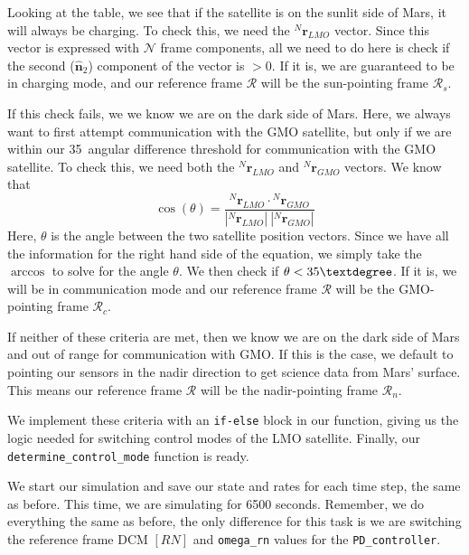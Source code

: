 \documentclass[conf]{new-aiaa}
\begin{document}
Looking at the table, we see that if the satellite is on the sunlit side of Mars, it will always be charging. To check this, we need the ${}^N\bm r_{LMO}$ vector. Since this vector is expressed with $\mathcal{N}$ frame components, all we need to do here is check if the second ($\hat{\bm n}_2$) component of the vector is $>0$. If it is, we are guaranteed to be in charging mode, and our reference frame $\mathcal{R}$ will be the sun-pointing frame $\mathcal{R}_s$. 

If this check fails, we we know we are on the dark side of Mars. Here, we always want to first attempt communication with the GMO satellite, but only if we are within our 35\textdegree\ angular difference threshold for communication with the GMO satellite. To check this, we need both the ${}^N\bm r_{LMO}$ and ${}^N\bm r_{GMO}$ vectors. We know that
\[
\cos(\theta) = \frac{{}^N\bm r_{LMO}\cdot{}^N\bm r_{GMO}}{|{}^N\bm r_{LMO}|\ |{}^N\bm r_{GMO}|}
\]
Here, $\theta$ is the angle between the two satellite position vectors. Since we have all the information for the right hand side of the equation, we simply take the $\arccos$ to solve for the angle $\theta$. We then check if $\theta < 35\textdegree$. If it is, we will be in communication mode and our reference frame $\mathcal{R}$ will be the GMO-pointing frame $\mathcal{R}_c$.

If neither of these criteria are met, then we know we are on the dark side of Mars and out of range for communication with GMO. If this is the case, we default to pointing our sensors in the nadir direction to get science data from Mars' surface. This means our reference frame $\mathcal{R}$ will be the nadir-pointing frame $\mathcal{R}_n$.

We implement these criteria with an \texttt{if-else} block in our function, giving us the logic needed for switching control modes of the LMO satellite. Finally, our \texttt{determine\_control\_mode} function is ready. 

We start our simulation and save our state and rates for each time step, the same as before. This time, we are simulating for 6500 seconds. Remember, we do everything the same as before, the only difference for this task is we are switching the reference frame DCM $[RN]$ and \texttt{omega\_rn} values for the \texttt{PD\_controller}.
\end{document}
